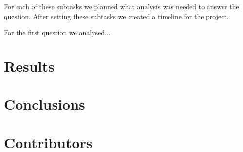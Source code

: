 \documentclass[11pt]{article}
\begin{document}
For each of these subtasks we planned what analysis was needed to answer the question. After setting these subtasks we created a timeline for the project. 

For the first question we analysed...



\section{Results}





\section{Conclusions}










\section{Contributors}
\end{document}
